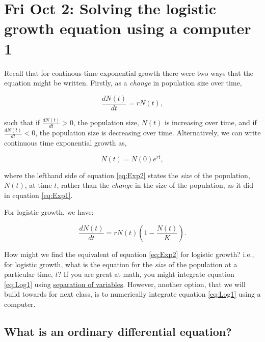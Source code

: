 \documentclass[]{book}
\begin{document}
\chapter{Fri Oct 2: Solving the logistic growth equation using a
computer
1}\label{fri-oct-2-solving-the-logistic-growth-equation-using-a-computer-1}

Recall that for continous time exponential growth there were two ways
that the equation might be written. Firstly, as a \emph{change} in
population size over time,

\begin{equation}
\frac{dN(t)}{dt} = rN(t),
\label{eq:Exp1}
\end{equation}

such that if \(\frac{dN(t)}{dt}>0\), the population size, \(N(t)\) is
increasing over time, and if \(\frac{dN(t)}{dt}<0\), the population size
is decreasing over time. Alternatively, we can write continuous time
exponential growth as,

\begin{equation}
N(t) = N(0)e^{rt},
\label{eq:Exp2}
\end{equation}

where the lefthand side of equation \eqref{eq:Exp2} states the \emph{size}
of the population, \(N(t)\), at time \(t\), rather than the
\emph{change} in the size of the population, as it did in equation
\eqref{eq:Exp1}.

For logistic growth, we have:

\begin{equation}
\frac{dN(t)}{dt} = rN(t)\left(1 - \frac{N(t)}{K} \right).
\label{eq:Log1}
\end{equation}

How might we find the equivalent of equation \eqref{eq:Exp2} for logistic
growth? i.e., for logistic growth, what is the equation for the
\emph{size} of the population at a particular time, \(t\)? If you are
great at math, you might integrate equation \eqref{eq:Log1} using
\href{https://math.usu.edu/~powell/ysa-html/node8.html}{separation of
variables}. However, another option, that we will build towards for next
class, is to numerically integrate equation \eqref{eq:Log1} using a
computer.

\section{What is an ordinary differential
equation?}\label{what-is-an-ordinary-differential-equation}
\end{document}
